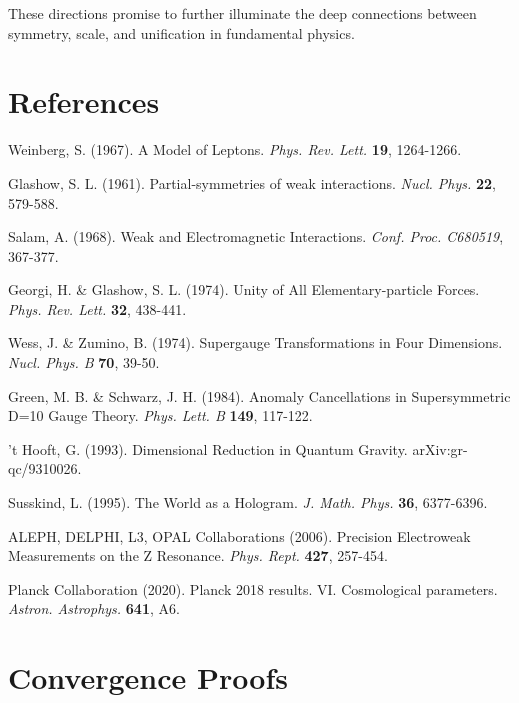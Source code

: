 \documentclass{article}
\begin{document}
These directions promise to further illuminate the deep connections between symmetry, scale, and unification in fundamental physics.

\section{References}

\begin{thebibliography}{99}

 Weinberg, S. (1967). A Model of Leptons. 
  \textit{Phys. Rev. Lett.} \textbf{19}, 1264-1266.

 Glashow, S. L. (1961). Partial-symmetries of weak interactions. 
  \textit{Nucl. Phys.} \textbf{22}, 579-588.

 Salam, A. (1968). Weak and Electromagnetic Interactions. 
  \textit{Conf. Proc. C680519}, 367-377.

 Georgi, H. \& Glashow, S. L. (1974). Unity of All Elementary-particle Forces.
  \textit{Phys. Rev. Lett.} \textbf{32}, 438-441.

 Wess, J. \& Zumino, B. (1974). Supergauge Transformations in Four Dimensions.
  \textit{Nucl. Phys. B} \textbf{70}, 39-50.

 Green, M. B. \& Schwarz, J. H. (1984). Anomaly Cancellations in Supersymmetric D=10 Gauge Theory.
  \textit{Phys. Lett. B} \textbf{149}, 117-122.

 't Hooft, G. (1993). Dimensional Reduction in Quantum Gravity.
  arXiv:gr-qc/9310026.

 Susskind, L. (1995). The World as a Hologram.
  \textit{J. Math. Phys.} \textbf{36}, 6377-6396.

 ALEPH, DELPHI, L3, OPAL Collaborations (2006). Precision Electroweak Measurements on the Z Resonance.
  \textit{Phys. Rept.} \textbf{427}, 257-454.

 Planck Collaboration (2020). Planck 2018 results. VI. Cosmological parameters.
  \textit{Astron. Astrophys.} \textbf{641}, A6.

\end{thebibliography}

\appendix
\section{Convergence Proofs}
\label{app:convergence}
\end{document}
